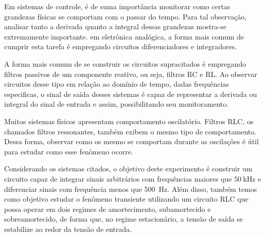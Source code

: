 Em sistemas de controle, é de suma importância monitorar como certas grandezas físicas se comportam com o passar do tempo. Para tal observação, analisar tanto a derivada quanto a integral dessas grandezas mostra-se extremamente importante. em eletrônica analógica, a forma mais comum de cumprir esta tarefa é empregando circuitos diferenciadores e integradores.

A forma mais comum de se construir os circuitos supracitados é empregando filtros passivos de um componente reativo, ou seja, filtros RC e RL. Ao observar circuitos desse tipo em relação ao domínio de tempo, dadas frequências especificas, o sinal de saída desses sistemas é capaz de representar a derivada ou integral do sinal de entrada e assim, possibilitando seu monitoramento.

Muitos sistemas físicos apresentam comportamento oscilatório. Filtros RLC, os chamados filtros ressonantes, também  exibem o mesmo tipo de comportamento. Dessa forma, observar como os mesmo se comportam durante as oscilações é útil para estudar como esse fenômeno ocorre.

Considerando os sistemas citados, o objetivo deste experimento é construir um circuito capaz de integrar sinais arbitrários com frequências maiores que $\SI{50}{\kilo\hertz}$ e diferenciar sinais com frequência menos que \SI{500}{\hertz}. Além disso, também temos como objetivo estudar o fenômeno transiente utilizando um circuito RLC que possa operar em dois regimes de amortecimento, subamortecido e sobreamortecido, de forma que, no regime estacionário, a tensão de saída se estabilize ao redor da tensão de entrada.
